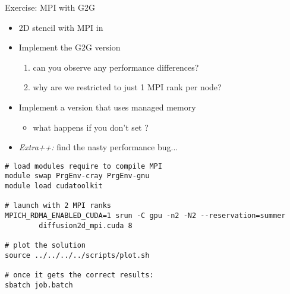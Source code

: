 \documentclass[aspectratio=43]{beamer}
\begin{document}
\begin{frame}[fragile]{Exercise: MPI with G2G}
    \begin{itemize}
        \item 2D stencil with MPI in 
        \item Implement the G2G version
        \begin{enumerate}
            \item can you observe any performance differences?
            \item why are we restricted to just 1 MPI rank per node?
        \end{enumerate}
        \item Implement a version that uses managed memory
        \begin{itemize}
            \item what happens if you don't set ?
        \end{itemize}
    \item \emph{Extra++:} find the nasty performance bug...
    \end{itemize}

    \begin{terminal}{}
        \begin{lstlisting}[style=terminal]
# load modules require to compile MPI
module swap PrgEnv-cray PrgEnv-gnu
module load cudatoolkit

# launch with 2 MPI ranks
MPICH_RDMA_ENABLED_CUDA=1 srun -C gpu -n2 -N2 --reservation=summer
        diffusion2d_mpi.cuda 8

# plot the solution
source ../../../../scripts/plot.sh

# once it gets the correct results:
sbatch job.batch
        \end{lstlisting}
   \end{terminal}

\end{frame}
\end{document}

